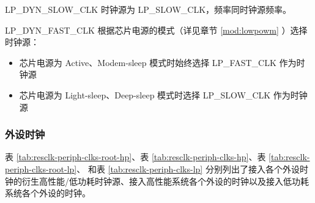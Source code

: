 \documentclass[main\_\_CN.tex]{subfiles}
\begin{document}
LP\_DYN\_SLOW\_CLK 时钟源为 LP\_SLOW\_CLK，频率同时钟源频率。

LP\_DYN\_FAST\_CLK 根据芯片电源的模式（详见章节 \ref{mod:lowpowm} \textit{}）选择时钟源：

\begin{itemize}
    \item 芯片电源为 Active、Modem-sleep 模式时始终选择 LP\_FAST\_CLK 作为时钟源
    \item 芯片电源为 Light-sleep、Deep-sleep 模式时选择 LP\_SLOW\_CLK 作为时钟源
\end{itemize}

\subsubsection{外设时钟}
表 \ref{tab:resclk-periph-clks-root-hp}、表 \ref{tab:resclk-periph-clks-hp}、表 \ref{tab:resclk-periph-clks-root-lp}、 和表 \ref{tab:resclk-periph-clks-lp} 分别列出了接入各个外设时钟的衍生高性能/低功耗时钟源、接入高性能系统各个外设的时钟以及接入低功耗系统各个外设的时钟。
\end{document}
